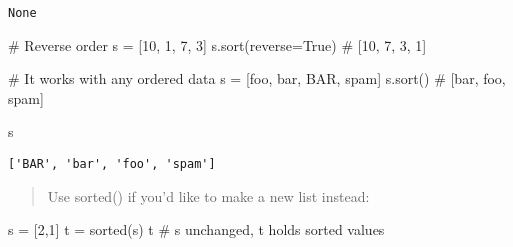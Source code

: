 \documentclass[
  letterpaper,
  DIV=11,
  numbers=noendperiod]{scrreprt}
\newenvironment{Shaded}{\begin{snugshade}}{\end{snugshade}}
\newcommand{\BuiltInTok}[1]{\textcolor[rgb]{0.00,0.46,0.62}{#1}}
\newcommand{\CommentTok}[1]{\textcolor[rgb]{0.37,0.37,0.37}{#1}}
\newcommand{\DecValTok}[1]{\textcolor[rgb]{0.68,0.00,0.00}{#1}}
\newcommand{\NormalTok}[1]{\textcolor[rgb]{0.00,0.46,0.62}{#1}}
\newcommand{\OperatorTok}[1]{\textcolor[rgb]{0.37,0.37,0.37}{#1}}
\newcommand{\StringTok}[1]{\textcolor[rgb]{0.13,0.47,0.30}{#1}}
\newcommand{\VariableTok}[1]{\textcolor[rgb]{0.07,0.07,0.07}{#1}}
\begin{document}
\begin{verbatim}
None
\end{verbatim}

\begin{Shaded}
\begin{Highlighting}[]
\CommentTok{\# Reverse order}
\NormalTok{s }\OperatorTok{=}\NormalTok{ [}\DecValTok{10}\NormalTok{, }\DecValTok{1}\NormalTok{, }\DecValTok{7}\NormalTok{, }\DecValTok{3}\NormalTok{]}
\NormalTok{s.sort(reverse}\OperatorTok{=}\VariableTok{True}\NormalTok{)        }\CommentTok{\# [10, 7, 3, 1]}
\end{Highlighting}
\end{Shaded}

\begin{Shaded}
\begin{Highlighting}[]
\CommentTok{\# It works with any ordered data}
\NormalTok{s }\OperatorTok{=}\NormalTok{ [}\StringTok{\textquotesingle{}foo\textquotesingle{}}\NormalTok{, }\StringTok{\textquotesingle{}bar\textquotesingle{}}\NormalTok{, }\StringTok{\textquotesingle{}BAR\textquotesingle{}}\NormalTok{, }\StringTok{\textquotesingle{}spam\textquotesingle{}}\NormalTok{]}
\NormalTok{s.sort()                    }\CommentTok{\# [\textquotesingle{}bar\textquotesingle{}, \textquotesingle{}foo\textquotesingle{}, \textquotesingle{}spam\textquotesingle{}]}
\end{Highlighting}
\end{Shaded}

\begin{Shaded}
\begin{Highlighting}[]
\NormalTok{s}
\end{Highlighting}
\end{Shaded}

\begin{verbatim}
['BAR', 'bar', 'foo', 'spam']
\end{verbatim}

\begin{quote}
Use sorted() if you'd like to make a new list instead:
\end{quote}

\begin{Shaded}
\begin{Highlighting}[]
\NormalTok{s }\OperatorTok{=}\NormalTok{ [}\DecValTok{2}\NormalTok{,}\DecValTok{1}\NormalTok{]}
\NormalTok{t }\OperatorTok{=} \BuiltInTok{sorted}\NormalTok{(s)  }
\NormalTok{t             }\CommentTok{\# s unchanged, t holds sorted values}
\end{Highlighting}
\end{Shaded}
\end{document}
